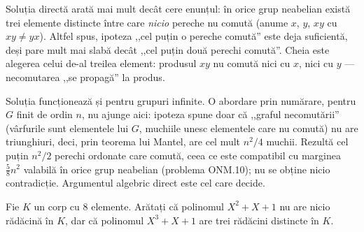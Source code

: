 \begin{obs}
Soluția directă arată mai mult decât cere enunțul: în
orice grup neabelian există trei elemente distincte între care
\emph{nicio} pereche nu comută (anume $x$, $y$, $xy$ cu $xy\neq yx$).
Altfel spus, ipoteza ,,cel puțin o pereche comută'' este deja
suficientă, deși pare mult mai slabă decât ,,cel puțin
două perechi comută''. Cheia este alegerea celui de-al treilea element:
produsul $xy$ nu comută nici cu $x$, nici cu $y$ --- necomutarea ,,se
propagă'' la produs.

Soluția funcționează și pentru grupuri infinite. O abordare prin
numărare, pentru $G$ finit de ordin $n$, nu ajunge aici: ipoteza spune
doar că ,,graful necomutării'' (vârfurile sunt elementele lui $G$,
muchiile unesc elementele care nu comută) nu are triunghiuri, deci, prin
teorema lui Mantel, are cel mult $n^{2}/4$ muchii. Rezultă cel puțin
$n^{2}/2$ perechi ordonate care comută, ceea ce este compatibil cu
marginea $\tfrac58 n^{2}$ valabilă în orice grup neabelian (problema
ONM.10); nu se obține nicio contradicție. Argumentul algebric direct
este cel care decide.
\end{obs}

\setcounter{cat}{2}\setcounter{problemaX}{0}

\begin{problema}
Fie $K$ un corp cu 8 elemente. Arătați că polinomul $X^2+X+1$ nu are nicio rădăcină în $K$, dar că polinomul $X^3+X+1$ are trei rădăcini distincte în $K$.
\end{problema}

